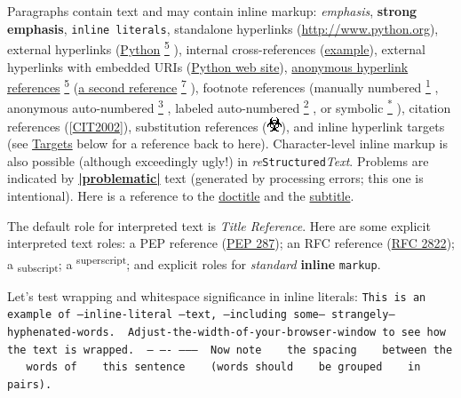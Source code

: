 \documentclass[a4paper]{article}
\providecommand*{\DUfootnotemark}[3]{%
  \raisebox{1em}{\hypertarget{#1}{}}%
  \hyperlink{#2}{\textsuperscript{#3}}%
}
\providecommand*{\DUroletitlereference}[1]{\textsl{#1}}
\begin{document}
Paragraphs contain text and may contain inline markup: \emph{emphasis},
\textbf{strong emphasis}, \texttt{inline literals}, standalone hyperlinks
(\url{http://www.python.org}), external hyperlinks (\href{http://www.python.org/}{Python}\DUfootnotemark{id30}{id29}{5}), internal
cross-references (\hyperref[example]{example}), external hyperlinks with embedded URIs
(\href{http://www.python.org}{Python web site}), \href{http://www.python.org/}{anonymous hyperlink
references}\DUfootnotemark{id35}{id29}{5} (\href{http://docutils.sourceforge.net/}{a second reference}\DUfootnotemark{id37}{id36}{7}), footnote references (manually
numbered\DUfootnotemark{id1}{id8}{1}, anonymous auto-numbered\DUfootnotemark{id2}{id12}{3}, labeled auto-numbered\DUfootnotemark{id3}{label}{2}, or symbolic\DUfootnotemark{id4}{id13}{*}), citation references ([\hyperlink{cit2002}{CIT2002}]),
substitution references (\includegraphics{../../../docs/user/rst/images/biohazard.png}), and %
\label{inline-hyperlink-targets}inline hyperlink targets
(see \hyperref[targets]{Targets} below for a reference back to here).  Character-level
inline markup is also possible (although exceedingly ugly!) in \emph{re}\texttt{Structured}\emph{Text}.  Problems are indicated by %
\hyperlink{id27}{\textbf{\color{red}|problematic|}} text
(generated by processing errors; this one is intentional).  Here is a
reference to the \hyperref[doctitle]{doctitle} and the \hyperref[subtitle]{subtitle}.

The default role for interpreted text is \DUroletitlereference{Title Reference}.  Here are
some explicit interpreted text roles: a PEP reference (\href{http://www.python.org/dev/peps/pep-0287}{PEP 287}); an
RFC reference (\href{http://www.faqs.org/rfcs/rfc2822.html}{RFC 2822}); a \textsubscript{subscript}; a \textsuperscript{superscript};
and explicit roles for \emph{standard} \textbf{inline}
\texttt{markup}.


Let's test wrapping and whitespace significance in inline literals:
\texttt{This is an example of --inline-literal --text, --including some--
strangely--hyphenated-words. ~Adjust-the-width-of-your-browser-window
to see how the text is wrapped. ~-- ---- -------- ~Now note ~ ~the
spacing ~ ~between the ~ ~words of ~ ~this sentence ~ ~(words
should ~ ~be grouped ~ ~in pairs).}
\end{document}
